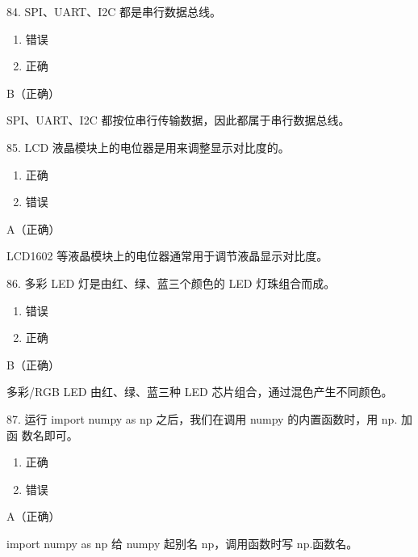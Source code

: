 \begin{question}{84. SPI、UART、I2C 都是串行数据总线。}
\begin{enumerate}[label=\Alph*., leftmargin=2.4em, itemsep=0.2em]
\item 错误
\item 正确
\end{enumerate}
\end{question}
\begin{answer}
B（正确）
\end{answer}
\begin{explanation}
SPI、UART、I2C 都按位串行传输数据，因此都属于串行数据总线。
\end{explanation}

\begin{question}{85. LCD 液晶模块上的电位器是用来调整显示对比度的。}
\begin{enumerate}[label=\Alph*., leftmargin=2.4em, itemsep=0.2em]
\item 正确
\item 错误
\end{enumerate}
\end{question}
\begin{answer}
A（正确）
\end{answer}
\begin{explanation}
LCD1602 等液晶模块上的电位器通常用于调节液晶显示对比度。
\end{explanation}

\begin{question}{86. 多彩 LED 灯是由红、绿、蓝三个颜色的 LED 灯珠组合而成。}
\begin{enumerate}[label=\Alph*., leftmargin=2.4em, itemsep=0.2em]
\item 错误
\item 正确
\end{enumerate}
\end{question}
\begin{answer}
B（正确）
\end{answer}
\begin{explanation}
多彩/RGB LED 由红、绿、蓝三种 LED 芯片组合，通过混色产生不同颜色。
\end{explanation}

\begin{question}{87. 运行 import numpy as np 之后，我们在调用 numpy 的内置函数时，用 np. 加函 数名即可。}
\begin{enumerate}[label=\Alph*., leftmargin=2.4em, itemsep=0.2em]
\item 正确
\item 错误
\end{enumerate}
\end{question}
\begin{answer}
A（正确）
\end{answer}
\begin{explanation}
import numpy as np 给 numpy 起别名 np，调用函数时写 np.函数名。
\end{explanation}

